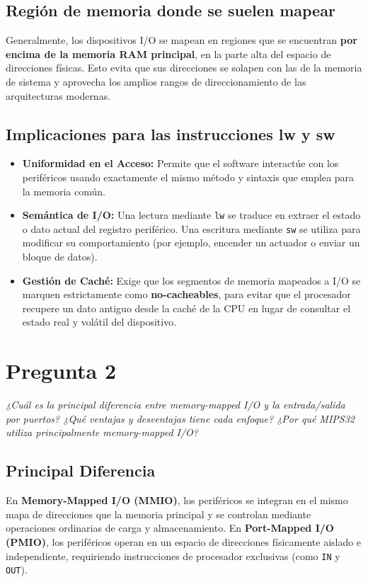 \documentclass[12pt,a4paper]{article}
\begin{document}
	\subsection{Región de memoria donde se suelen mapear}
	Generalmente, los dispositivos I/O se mapean en regiones que se encuentran \textbf{por encima de la memoria RAM principal}, en la parte alta del espacio de direcciones físicas. Esto evita que sus direcciones se solapen con las de la memoria de sistema y aprovecha los amplios rangos de direccionamiento de las arquitecturas modernas.
	
	\subsection{Implicaciones para las instrucciones lw y sw}
	\begin{itemize}
		\item \textbf{Uniformidad en el Acceso:} Permite que el software interactúe con los periféricos usando exactamente el mismo método y sintaxis que emplea para la memoria común.
		\item \textbf{Semántica de I/O:} Una lectura mediante \texttt{lw} se traduce en extraer el estado o dato actual del registro periférico. Una escritura mediante \texttt{sw} se utiliza para modificar su comportamiento (por ejemplo, encender un actuador o enviar un bloque de datos).
		\item \textbf{Gestión de Caché:} Exige que los segmentos de memoria mapeados a I/O se marquen estrictamente como \textbf{no-cacheables}, para evitar que el procesador recupere un dato antiguo desde la caché de la CPU en lugar de consultar el estado real y volátil del dispositivo.
	\end{itemize}
	
	\section{Pregunta 2}
	\textit{¿Cuál es la principal diferencia entre memory-mapped I/O y la entrada/salida por puertos? ¿Qué ventajas y desventajas tiene cada enfoque? ¿Por qué MIPS32 utiliza principalmente memory-mapped I/O?}
	
	\subsection{Principal Diferencia}
	En \textbf{Memory-Mapped I/O (MMIO)}, los periféricos se integran en el mismo mapa de direcciones que la memoria principal y se controlan mediante operaciones ordinarias de carga y almacenamiento. En \textbf{Port-Mapped I/O (PMIO)}, los periféricos operan en un espacio de direcciones físicamente aislado e independiente, requiriendo instrucciones de procesador exclusivas (como \texttt{IN} y \texttt{OUT}).
	
\end{document}
